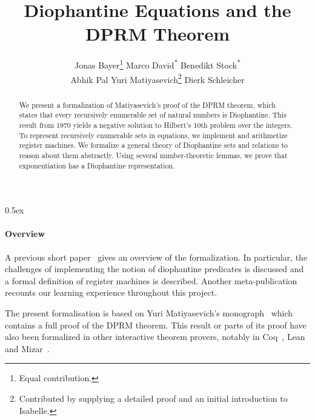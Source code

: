 \documentclass[11pt,a4paper]{article}
\begin{document}
\title{Diophantine Equations and the DPRM Theorem}

\author{Jonas Bayer\thanks{Equal contribution.} \hspace*{10ex} Marco David\textsuperscript{*}
         \hspace*{10ex} Benedikt Stock\textsuperscript{*} \\ Abhik Pal
         \hspace*{10ex} Yuri Matiyasevich\thanks{Contributed by supplying a detailed proof and an
        initial introduction to Isabelle.}
         \hspace*{10ex} Dierk Schleicher}

\maketitle


\begin{abstract}
	We present a formalization of Matiyasevich's proof of the DPRM theorem, which states that every
  recursively enumerable set of natural numbers is Diophantine. This result from 1970 yields a
  negative solution to Hilbert's 10th problem over the integers. To represent recursively
  enumerable sets in equations, we implement and arithmetize register machines. We formalize a
  general theory of Diophantine sets and relations to reason about them abstractly.
  Using several number-theoretic lemmas, we prove that exponentiation has a Diophantine
  representation.
\end{abstract}

\tableofcontents

\newpage

\parindent 0pt\parskip 0.5ex

\paragraph{Overview}
A previous short paper~\cite{dprm_isabelle} gives an overview
of the formalization. In particular, the challenges of implementing the notion of 
diophantine predicates is discussed and a formal definition of register machines is described.
Another meta-publication~\cite{cicm} recounts our learning experience throughout this project.

The present formalisation is based on Yuri Matiyasevich's monograph~\cite{h10lecturenotes} which
contains a full proof of the DPRM theorem. This result or parts of its proof have also been
formalized in other interactive theorem provers, notably in Coq~\cite{dprm_coq},
Lean~\cite{dprm_lean} and Mizar~\cite{dprm_mizar1,dprm_mizar2}.
\end{document}
